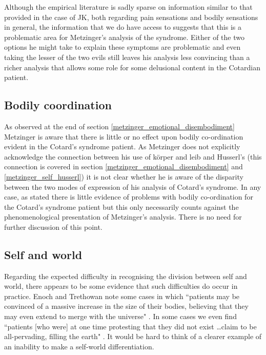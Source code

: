 Although the empirical literature is sadly sparse on information similar to that provided in the case of JK, both regarding pain sensations and bodily sensations in general, the information that we do have access to suggests that this is a problematic area for Metzinger's analysis of the syndrome. Either of the two options he might take to explain these symptoms are problematic and even taking the lesser of the two evils still leaves his analysis less convincing than a richer analysis that allows some role for some delusional content in the Cotardian patient.

\subsection{Bodily coordination}

As observed at the end of section \ref{metzinger_emotional_disembodiment} Metzinger is aware that there is little or no effect upon bodily co-ordination evident in the Cotard's syndrome patient. As Metzinger does not explicitly acknowledge the connection between his use of körper and leib and Husserl's (this connection is covered in section \ref{metzinger_emotional_disembodiment} and \ref{metzinger_self_husserl}) it is not clear whether he is aware of the disparity between the two modes of expression of his analysis of Cotard's syndrome. In any case, as stated there is little evidence of problems with bodily co-ordination for the Cotard's syndrome patient but this only necessarily counts against the phenomenological presentation of Metzinger's analysis. There is no need for further discussion of this point.

\subsection{Self and world}

Regarding the expected difficulty in recognising the division between self and world, there appears to be some evidence that such difficulties do occur in practice. Enoch and Trethowan note some cases in which ``patients may be convinced of a massive increase in the size of their bodies, believing that they may even extend to merge with the universe" \cite[p. 174]{enoch1991}. In some cases we even find ``patients [who were] at one time protesting that they did not exist \ldots claim to be all-pervading, filling the earth" \cite[p. 174]{enoch1991}. It would be hard to think of a clearer example of an inability to make a self-world differentiation.

